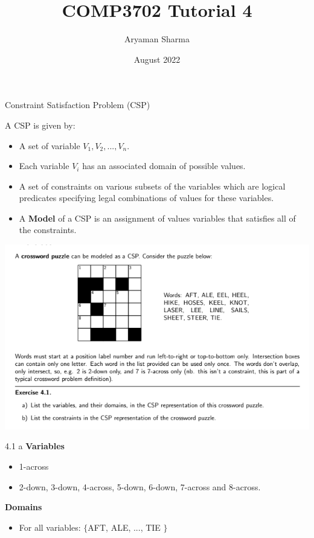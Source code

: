 \documentclass[11pt]{beamer}
\author{Aryaman Sharma}
\title{COMP3702 Tutorial 4}
\date{August 2022}
\begin{document}
\begin{frame}
	\titlepage
\end{frame}


\begin{frame}{Constraint Satisfaction Problem (CSP)}
\begin{definition}
A CSP is given by:
\begin{itemize}
	\pause
	\item A set of variable $V_1, V_2, ..., V_n$.\pause
	\item Each variable $V_i$ has an associated domain of possible values. \pause
	\item A set of constraints on various subsets of the variables which are logical predicates specifying legal combinations of values for these variables. \pause
	\item A \textbf{Model} of a CSP is an assignment of values variables that satisfies all of the constraints. 
\end{itemize}
\end{definition}
\end{frame}

\begin{frame}{4.1}
\includegraphics[scale=0.5]{images/41.png}
\end{frame}

\begin{frame}{4.1 a}
\textbf{Variables} \pause
\begin{itemize}
	\item 1-across \pause
	\item 2-down, 3-down, 4-across, 5-down, 6-down, 7-across and 8-across.
\end{itemize}
\pause
\textbf{Domains} \pause
\begin{itemize}
	\item For all variables: $\{$AFT, ALE, ..., TIE $\}$
\end{itemize}
\end{frame}
\end{document}
